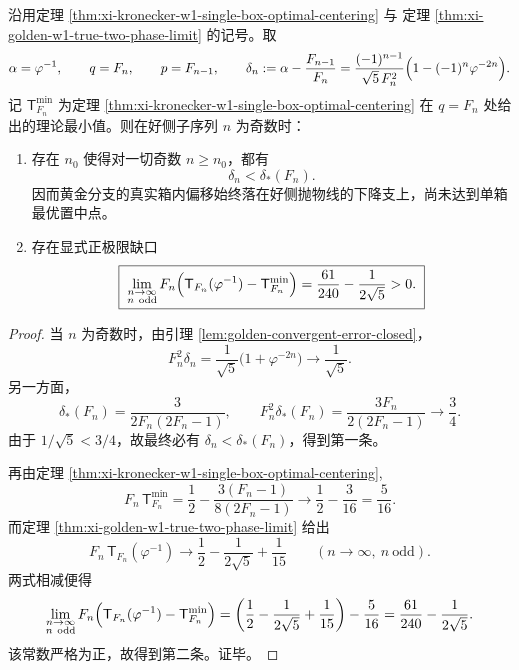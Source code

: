 \begin{corollary}[黄金分支在好侧未达单箱最优置中且保有显式正缺口]\label{cor:xi-golden-w1-good-side-gap-to-single-box-optimum}
沿用定理 \ref{thm:xi-kronecker-w1-single-box-optimal-centering} 与
定理 \ref{thm:xi-golden-w1-true-two-phase-limit} 的记号。取
\[
\alpha=\varphi^{-1},
\qquad
q=F_n,
\qquad
p=F_{n-1},
\qquad
\delta_n:=\alpha-\frac{F_{n-1}}{F_n}
=
\frac{(-1)^{n-1}}{\sqrt5\,F_n^2}\Bigl(1-(-1)^n\varphi^{-2n}\Bigr).
\]
记 \(\mathsf{T}_{F_n}^{\min}\) 为定理 \ref{thm:xi-kronecker-w1-single-box-optimal-centering} 在 \(q=F_n\) 处给出的理论最小值。则在好侧子序列 \(n\) 为奇数时：
\begin{enumerate}
  \item 存在 \(n_0\) 使得对一切奇数 \(n\ge n_0\)，都有
  \[
  \delta_n<\delta_\ast(F_n).
  \]
  因而黄金分支的真实箱内偏移始终落在好侧抛物线的下降支上，尚未达到单箱最优置中点。
  \item 存在显式正极限缺口
  \[
  \boxed{\;
  \lim_{\substack{n\to\infty\\ n\ \mathrm{odd}}}
  F_n\Bigl(\mathsf{T}_{F_n}(\varphi^{-1})-\mathsf{T}_{F_n}^{\min}\Bigr)
  =
  \frac{61}{240}-\frac{1}{2\sqrt5}
  >0.\;}
  \]
\end{enumerate}
\end{corollary}
\begin{proof}
当 \(n\) 为奇数时，由引理 \ref{lem:golden-convergent-error-closed}，
\[
F_n^2\delta_n
=
\frac{1}{\sqrt5}\bigl(1+\varphi^{-2n}\bigr)
\longrightarrow \frac1{\sqrt5}.
\]
另一方面，
\[
\delta_\ast(F_n)=\frac{3}{2F_n(2F_n-1)},
\qquad
F_n^2\delta_\ast(F_n)=\frac{3F_n}{2(2F_n-1)}
\longrightarrow \frac34.
\]
由于 \(1/\sqrt5<3/4\)，故最终必有 \(\delta_n<\delta_\ast(F_n)\)，得到第一条。

再由定理 \ref{thm:xi-kronecker-w1-single-box-optimal-centering},
\[
F_n\,\mathsf{T}_{F_n}^{\min}
=
\frac12-\frac{3(F_n-1)}{8(2F_n-1)}
\longrightarrow
\frac12-\frac{3}{16}
=
\frac{5}{16}.
\]
而定理 \ref{thm:xi-golden-w1-true-two-phase-limit} 给出
\[
F_n\,\mathsf{T}_{F_n}(\varphi^{-1})
\longrightarrow
\frac12-\frac{1}{2\sqrt5}+\frac1{15}
\qquad
(n\to\infty,\ n\ \mathrm{odd}).
\]
两式相减便得
\[
\lim_{\substack{n\to\infty\\ n\ \mathrm{odd}}}
F_n\Bigl(\mathsf{T}_{F_n}(\varphi^{-1})-\mathsf{T}_{F_n}^{\min}\Bigr)
=
\left(\frac12-\frac{1}{2\sqrt5}+\frac1{15}\right)-\frac{5}{16}
=
\frac{61}{240}-\frac{1}{2\sqrt5}.
\]
该常数严格为正，故得到第二条。证毕。
\end{proof}

\endinput
